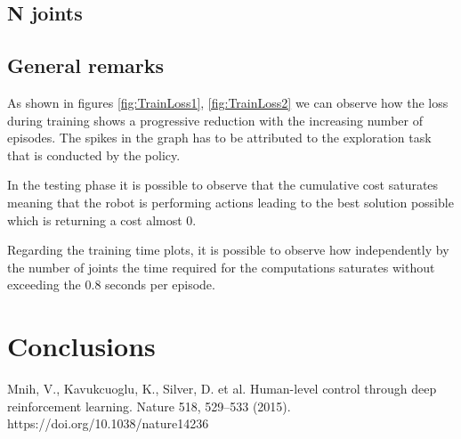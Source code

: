 \documentclass[twocolumn, a4paper]{article}
\begin{document}
\subsection{N joints}

\subsection{General remarks}
As shown in figures \ref{fig:TrainLoss1}, \ref{fig:TrainLoss2}
we can observe how the loss during
training shows a progressive reduction with the increasing number of episodes.
The spikes in the graph has to be attributed to the exploration task that
is conducted by the policy.

In the testing phase it is possible to observe that the cumulative cost
saturates meaning that the robot is performing actions leading to the best
solution possible which is returning a cost almost 0.

Regarding the training time plots, it is possible to observe how independently
by the number of joints the time required for the computations saturates
without exceeding the 0.8 seconds per episode.
\newpage
\section{Conclusions}

\begin{thebibliography}{9}
	Mnih, V., Kavukcuoglu, K., Silver, D. et al. Human-level control through
	deep reinforcement learning. Nature 518, 529–533 (2015).
	https://doi.org/10.1038/nature14236
\end{thebibliography}
\end{document}
